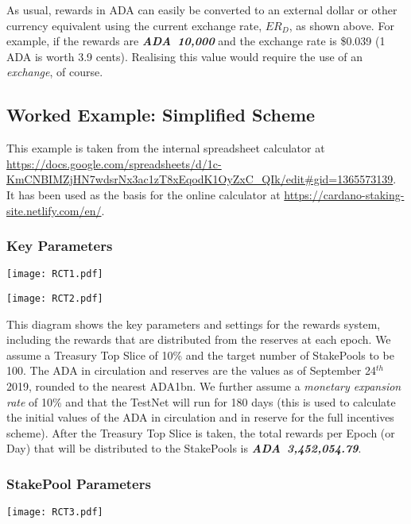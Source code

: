 \documentclass[11pt,a4paper,dvipsnames,twosided,final]{article}
\newcommand{\ada}{ADA{}}
\newcommand{\ADA}[1]{\textbf{\emph{\ada~{#1}}}}
\begin{document}
\noindent
As usual, rewards in \ada{} can easily be converted to an external dollar or other currency equivalent using
the current exchange rate, $ER_D$, as shown %
above.  For example, if the rewards are \ADA{10,000} and the exchange rate is
\$0.039 (1 \ada{} is worth 3.9 cents).  Realising this value would require the use of an \emph{exchange},
of course.

\clearpage
\subsection{Worked Example: Simplified Scheme}


\begin{minipage}{\textwidth}
  This example is taken from the internal \IOHK{} spreadsheet calculator at
\url{https://docs.google.com/spreadsheets/d/1c-KmCNBIMZjHN7wdsrNx3ac1zT8xEqodK1OyZxC_QIk/edit#gid=1365573139}.
It has been used as the basis for the online calculator at \url{https://cardano-staking-site.netlify.com/en/}.

\subsubsection*{Key Parameters}

\noindent
\vspace{-0.5in}
\texttt{[image: RCT1.pdf]}
\vspace{-2in}

\noindent
\texttt{[image: RCT2.pdf]}
\vspace{-1.9in}

\noindent
This diagram shows the key parameters and settings for the rewards system, including the
rewards that are distributed from the reserves at each epoch.  We assume a Treasury Top Slice
of 10\% and the target number of StakePools to be 100.  The \ada{} in circulation and reserves
are the values as of September 24$^{th}$ 2019, rounded to the nearest ADA{1bn}.  We further
assume a \emph{monetary expansion rate} of 10\% and that the TestNet will run for 180 days
(this is used to calculate the initial values of the \ada{} in circulation and in reserve
for the full incentives scheme).  After the Treasury Top Slice is taken, the total
rewards per Epoch (or Day) that will be distributed to the StakePools is \ADA{3,452,054.79}.
\end{minipage}

\clearpage
\subsubsection*{StakePool Parameters}
\texttt{[image: RCT3.pdf]}
\vspace{-0.5in}
\end{document}
